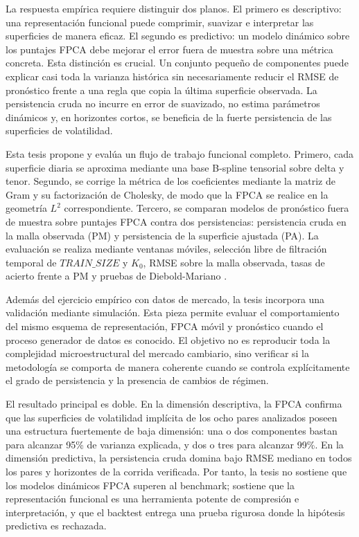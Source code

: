 \documentclass[a4paper,11pt]{article}
\newcommand{\SVIs}{superficies de volatilidad implícita}
\begin{document}
La respuesta empírica requiere distinguir dos planos. El primero es descriptivo: una representación funcional puede comprimir, suavizar e interpretar las superficies de manera eficaz. El segundo es predictivo: un modelo dinámico sobre los puntajes FPCA debe mejorar el error fuera de muestra sobre una métrica concreta. Esta distinción es crucial. Un conjunto pequeño de componentes puede explicar casi toda la varianza histórica sin necesariamente reducir el RMSE de pronóstico frente a una regla que copia la última superficie observada. La persistencia cruda no incurre en error de suavizado, no estima parámetros dinámicos y, en horizontes cortos, se beneficia de la fuerte persistencia de las superficies de volatilidad.

Esta tesis propone y evalúa un flujo de trabajo funcional completo. Primero, cada superficie diaria se aproxima mediante una base B-spline tensorial sobre delta y tenor. Segundo, se corrige la métrica de los coeficientes mediante la matriz de Gram y su factorización de Cholesky, de modo que la FPCA se realice en la geometría \(L^2\) correspondiente. Tercero, se comparan modelos de pronóstico fuera de muestra sobre puntajes FPCA contra dos persistencias: persistencia cruda en la malla observada (PM) y persistencia de la superficie ajustada (PA). La evaluación se realiza mediante ventanas móviles, selección libre de filtración temporal de \(TRAIN\_SIZE\) y \(K_0\), RMSE sobre la malla observada, tasas de acierto frente a PM y pruebas de Diebold-Mariano \cite{DieboldMariano1995}.

Además del ejercicio empírico con datos de mercado, la tesis incorpora una validación mediante simulación. Esta pieza permite evaluar el comportamiento del mismo esquema de representación, FPCA móvil y pronóstico cuando el proceso generador de datos es conocido. El objetivo no es reproducir toda la complejidad microestructural del mercado cambiario, sino verificar si la metodología se comporta de manera coherente cuando se controla explícitamente el grado de persistencia y la presencia de cambios de régimen.

El resultado principal es doble. En la dimensión descriptiva, la FPCA confirma que las \SVIs{} de los ocho pares analizados poseen una estructura fuertemente de baja dimensión: una o dos componentes bastan para alcanzar 95\% de varianza explicada, y dos o tres para alcanzar 99\%. En la dimensión predictiva, la persistencia cruda domina bajo RMSE mediano en todos los pares y horizontes de la corrida verificada. Por tanto, la tesis no sostiene que los modelos dinámicos FPCA superen al benchmark; sostiene que la representación funcional es una herramienta potente de compresión e interpretación, y que el backtest entrega una prueba rigurosa donde la hipótesis predictiva es rechazada.
\end{document}

